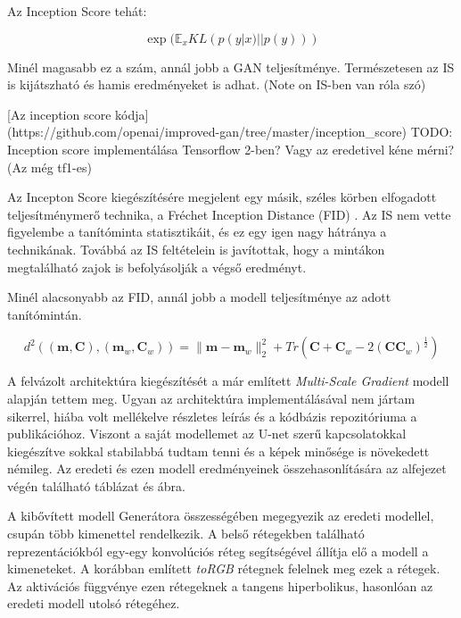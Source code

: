 Az Inception Score tehát:

$$ \exp(\mathbb{E}_x KL(p(y|x)||p(y))) $$

Minél magasabb ez a szám, annál jobb a GAN teljesítménye. Természetesen az IS is kijátszható és hamis eredményeket is adhat. (Note on IS-ben van róla szó)


[Az inception score kódja]\\(https://github.com/openai/improved-gan/tree/master/inception\_score)
TODO: Inception score implementálása Tensorflow 2-ben? Vagy az eredetivel kéne mérni? (Az még tf1-es)


Az Incepton Score kiegészítésére megjelent egy másik, széles körben elfogadott teljesítménymerő technika, a Fréchet Inception Distance (FID) \cite{heusel2017gans}. Az IS nem vette figyelembe a tanítóminta statisztikáit, és ez egy igen nagy hátránya a technikának. Továbbá az IS feltételein is javítottak, hogy a mintákon megtalálható zajok is befolyásolják a végső eredményt.


Minél alacsonyabb az FID, annál jobb a modell teljesítménye az adott tanítómintán.

$$ d^2((\boldsymbol{m}, \boldsymbol{C}), (\boldsymbol{m}_w, \boldsymbol{C}_w)) = \|\boldsymbol{m} - \boldsymbol{m}_w \|_2^2 + Tr(\boldsymbol{C} + \boldsymbol{C}_w - 2(\boldsymbol{C}\boldsymbol{C}_w)^{\frac{1}{2}}) $$







A felvázolt architektúra kiegészítését a már említett \textit{Multi-Scale Gradient} \cite{karnewar2020msg} modell alapján tettem meg. Ugyan az architektúra implementálásával nem jártam sikerrel, hiába volt mellékelve részletes leírás és a kódbázis repozitóriuma a publikációhoz. Viszont a saját modellemet az U-net szerű kapcsolatokkal kiegészítve sokkal stabilabbá tudtam tenni és a képek minősége is növekedett némileg. Az eredeti és ezen modell eredményeinek összehasonlítására az alfejezet végén található táblázat és ábra.

A kibővített modell Generátora összességében megegyezik az eredeti modellel, csupán több kimenettel rendelkezik. A belső rétegekben található reprezentációkból egy-egy konvolúciós réteg segítségével állítja elő a modell a kimeneteket. A korábban említett \textit{toRGB} rétegnek felelnek meg ezek a rétegek. Az aktivációs függvénye ezen rétegeknek a tangens hiperbolikus, hasonlóan az eredeti modell utolsó rétegéhez.


